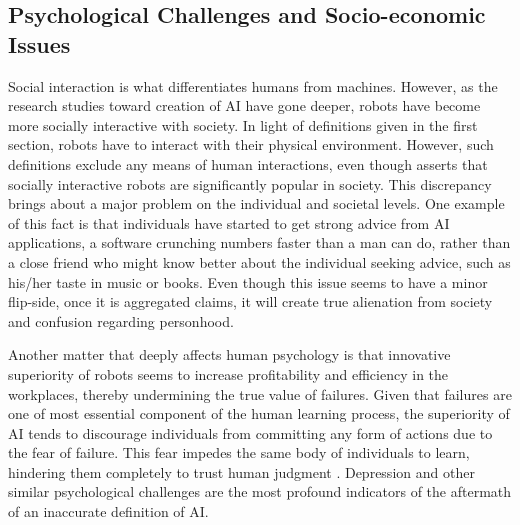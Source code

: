 \documentclass[man]{apa6}
\begin{document}
\subsection{Psychological Challenges and Socio-economic Issues}
Social interaction is what differentiates humans from machines.
However, as the research studies toward creation of AI have gone deeper, robots have become more socially interactive with society.
In light of definitions given in the first section, robots have to interact with their physical environment.
However, such definitions exclude any means of human interactions, even though  asserts that socially interactive robots are significantly popular in society.
This discrepancy brings about a major problem on the individual and societal levels.
One example of this fact is that individuals have started to get strong advice from AI applications, a software crunching numbers faster than a man can do, rather than a close friend who might know better about the individual seeking advice, such as his/her taste in music or books.
Even though this issue seems to have a minor flip-side, once it is aggregated  claims, it will create true alienation from society and confusion regarding personhood. \par
Another matter that deeply affects human psychology is that innovative superiority of robots seems to increase profitability and efficiency in the workplaces, thereby undermining the true value of failures.
Given that failures are one of most essential component of the human learning process, the superiority of AI tends to discourage individuals from committing any form of actions due to the fear of failure. 
This fear impedes the same body of individuals to learn, hindering them completely to trust human judgment .
Depression and other similar psychological challenges are the most profound indicators of the aftermath of an inaccurate definition of AI. \par
\end{document}
